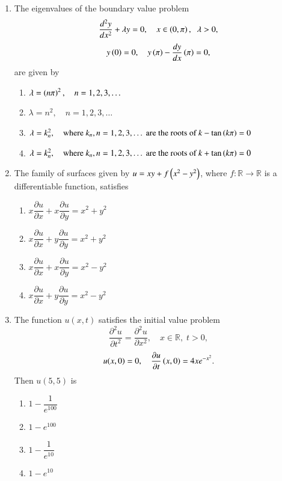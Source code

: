 \documentclass[journal,12pt,onecolumn]{IEEEtran}
\theoremstyle{remark}
\begin{document}
\begin{enumerate}[start=1, label=Q.\arabic*]
\hfill{}


\item The eigenvalues of the boundary value problem
\[
\dfrac{d^{2}y}{dx^{2}}+\lambda y=0,\quad x \in \left(0,\pi\right),\;\; \lambda>0,
\]
\[
y\left(0\right)=0,\quad y\left(\pi\right)-\dfrac{dy}{dx}\left(\pi\right)=0,
\]
are given by
\begin{enumerate}
\item $\lambda=\left(n\pi\right)^{2},\quad n=1,2,3,\dots$
\item $\lambda=n^{2},\quad n=1,2,3,\dots$
\item $\lambda=k_{n}^{2},\quad \text{where } k_{n}, n=1,2,3,\dots \text{ are the roots of } k-\tan\left(k\pi\right)=0$
\item $\lambda=k_{n}^{2},\quad \text{where } k_{n}, n=1,2,3,\dots \text{ are the roots of } k+\tan\left(k\pi\right)=0$
\end{enumerate}

\hfill{}
\item The family of surfaces given by $u=xy+f\left(x^{2}-y^{2}\right)$, where $f : \mathbb{R}\to\mathbb{R}$ is a differentiable function, satisfies
\begin{enumerate}
\item $x\dfrac{\partial u}{\partial x}+x\dfrac{\partial u}{\partial y}=x^{2}+y^{2}$
\item $x\dfrac{\partial u}{\partial x}+y\dfrac{\partial u}{\partial y}=x^{2}+y^{2}$
\item $x\dfrac{\partial u}{\partial x}+x\dfrac{\partial u}{\partial y}=x^{2}-y^{2}$
\item $x\dfrac{\partial u}{\partial x}+y\dfrac{\partial u}{\partial y}=x^{2}-y^{2}$
\end{enumerate}

\hfill{}


\item The function $u(x,t)$ satisfies the initial value problem
\[
\dfrac{\partial^{2}u}{\partial t^{2}}=\dfrac{\partial^{2}u}{\partial x^{2}},\quad x \in \mathbb{R},\; t>0,
\]
\[
u(x,0)=0,\quad \dfrac{\partial u}{\partial t}\left(x,0\right)=4x e^{-x^{2}}.
\]
Then $u(5,5)$ is
\begin{enumerate}
\item $1-\dfrac{1}{e^{100}}$
\item $1-e^{100}$
\item $1-\dfrac{1}{e^{10}}$
\item $1-e^{10}$
\end{enumerate}


\end{enumerate}
\end{document}
